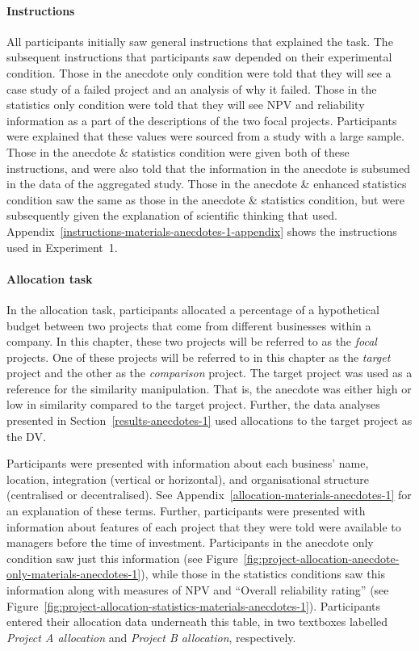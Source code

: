 \documentclass[a4paper, nobind, dvipsnames]{templates/ociamthesis}
\theoremstyle{definition}
\theoremstyle{definition}
\theoremstyle{definition}
\theoremstyle{definition}
\theoremstyle{remark}
\begin{document}
\hypertarget{instructions-materials-anecdotes-1}{%
\paragraph{Instructions}\label{instructions-materials-anecdotes-1}}

All participants initially saw general instructions that explained the task. The
subsequent instructions that participants saw depended on their experimental
condition. Those in the anecdote only condition were told that they will see a
case study of a failed project and an analysis of why it failed. Those in the
statistics only condition were told that they will see NPV and reliability
information as a part of the descriptions of the two focal projects.
Participants were explained that these values were sourced from a study with a
large sample. Those in the anecdote \& statistics condition were given both of
these instructions, and were also told that the information in the anecdote is
subsumed in the data of the aggregated study. Those in the anecdote \& enhanced
statistics condition saw the same as those in the anecdote \& statistics
condition, but were subsequently given the explanation of scientific thinking
that \textcite{wainberg2018} used.
Appendix~\ref{instructions-materials-anecdotes-1-appendix} shows the
instructions used in Experiment~1.

\paragraph{Allocation task}

In the allocation task, participants allocated a percentage of a hypothetical
budget between two projects that come from different businesses within a
company. In this chapter, these two projects will be referred to as the \emph{focal}
projects. One of these projects will be referred to in this chapter as the
\emph{target} project and the other as the \emph{comparison} project. The target project
was used as a reference for the similarity manipulation. That is, the anecdote
was either high or low in similarity compared to the target project. Further,
the data analyses presented in Section~\ref{results-anecdotes-1} used
allocations to the target project as the DV.

Participants were presented with information about each business' name,
location, integration (vertical or horizontal), and organisational structure
(centralised or decentralised). See
Appendix~\ref{allocation-materials-anecdotes-1} for an explanation of these
terms. Further, participants were presented with information about features of
each project that they were told were available to managers before the time of
investment. Participants in the anecdote only condition saw just this
information (see
Figure~\ref{fig:project-allocation-anecdote-only-materials-anecdotes-1}), while
those in the statistics conditions saw this information along with measures of
NPV and ``Overall reliability rating'' (see
Figure~\ref{fig:project-allocation-statistics-materials-anecdotes-1}).
Participants entered their allocation data underneath this table, in two
textboxes labelled \emph{Project A allocation} and \emph{Project B allocation},
respectively.
\end{document}
